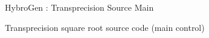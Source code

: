 \begin{Frame}{HybroGen : Transprecision Source Main}
  \begin{block}{Transprecision square root source code (main control)}
    
  \end{block}
\end{Frame}
